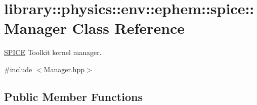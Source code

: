 \hypertarget{classlibrary_1_1physics_1_1env_1_1ephem_1_1spice_1_1_manager}{}\section{library\+:\+:physics\+:\+:env\+:\+:ephem\+:\+:spice\+:\+:Manager Class Reference}
\label{classlibrary_1_1physics_1_1env_1_1ephem_1_1spice_1_1_manager}


\hyperlink{classlibrary_1_1physics_1_1env_1_1ephem_1_1_s_p_i_c_e}{S\+P\+I\+CE} Toolkit kernel manager.  




{\ttfamily \#include $<$Manager.\+hpp$>$}

\subsection*{Public Member Functions}
